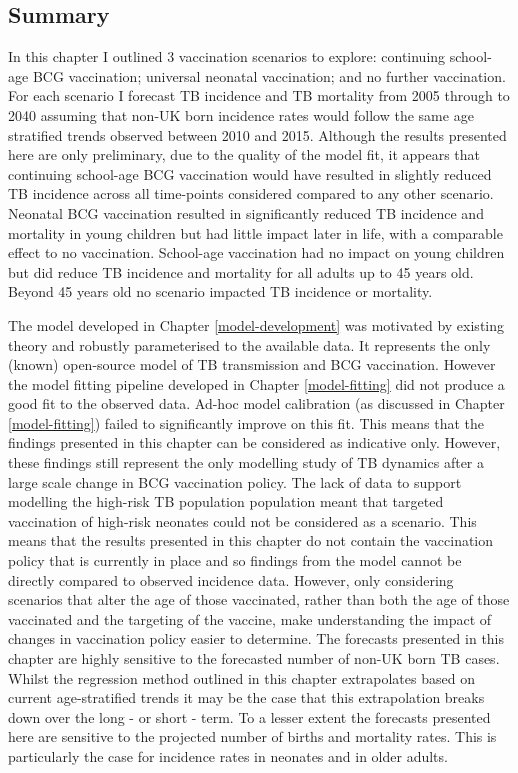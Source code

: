 \documentclass[11pt,twoside]{bristolthesis}
\begin{document}
  \hypertarget{summary-9}{%
  \subsection{Summary}\label{summary-9}}
  
  In this chapter I outlined 3 vaccination scenarios to explore: continuing school-age BCG vaccination; universal neonatal vaccination; and no further vaccination. For each scenario I forecast TB incidence and TB mortality from 2005 through to 2040 assuming that non-UK born incidence rates would follow the same age stratified trends observed between 2010 and 2015. Although the results presented here are only preliminary, due to the quality of the model fit, it appears that continuing school-age BCG vaccination would have resulted in slightly reduced TB incidence across all time-points considered compared to any other scenario. Neonatal BCG vaccination resulted in significantly reduced TB incidence and mortality in young children but had little impact later in life, with a comparable effect to no vaccination. School-age vaccination had no impact on young children but did reduce TB incidence and mortality for all adults up to 45 years old. Beyond 45 years old no scenario impacted TB incidence or mortality.
  
  The model developed in Chapter \ref{model-development} was motivated by existing theory and robustly parameterised to the available data. It represents the only (known) open-source model of TB transmission and BCG vaccination. However the model fitting pipeline developed in Chapter \ref{model-fitting} did not produce a good fit to the observed data. Ad-hoc model calibration (as discussed in Chapter \ref{model-fitting}) failed to significantly improve on this fit. This means that the findings presented in this chapter can be considered as indicative only. However, these findings still represent the only modelling study of TB dynamics after a large scale change in BCG vaccination policy. The lack of data to support modelling the high-risk TB population population meant that targeted vaccination of high-risk neonates could not be considered as a scenario. This means that the results presented in this chapter do not contain the vaccination policy that is currently in place and so findings from the model cannot be directly compared to observed incidence data. However, only considering scenarios that alter the age of those vaccinated, rather than both the age of those vaccinated and the targeting of the vaccine, make understanding the impact of changes in vaccination policy easier to determine. The forecasts presented in this chapter are highly sensitive to the forecasted number of non-UK born TB cases. Whilst the regression method outlined in this chapter extrapolates based on current age-stratified trends it may be the case that this extrapolation breaks down over the long - or short - term. To a lesser extent the forecasts presented here are sensitive to the projected number of births and mortality rates. This is particularly the case for incidence rates in neonates and in older adults.
  
\end{document}
